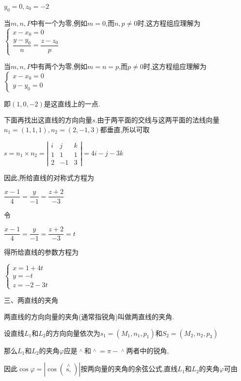 \documentclass[oneside]{book}
\begin{document}
${y_0} = 0,{z_0} =  - 2$

当$m,n,P$中有一个为零,例如$m=0$,而$n,p \ne 0$时,这方程组应理解为$\left\{\begin{array}{l}{x-x_{0}=0} \\ {\dfrac{y-y_{0}}{n}=\dfrac{z-z_{0}}{p}}\end{array}\right.$

当$m,n,P$中有两个为零,例如$m=n=p$,而$p \ne 0$时,这方程组应理解为$\left\{\begin{array}{l}{x-x_{0}=0} \\ {y-y_{0}=0}\end{array}\right.$

即$(1,0,-2)$是这直线上的一点.

下面再找出这直线的方向向量$s$.由于两平面的交线与这两平面的法线向量${n_1} = (1,1,1),{n_2} = (2, - 1,3)$都垂直,所以可取

$s=n_{1} \times n_{2}=\left|\begin{array}{ccc}{i} & {j} & {k} \\ {1} & {1} & {1} \\ {2} & {-1} & {3}\end{array}\right|=4 i-j-3 k$

因此,所给直线的对称式方程为

$\dfrac{{x - 1}}{4} = \dfrac{y}{{ - 1}} = \dfrac{{z + 2}}{{ - 3}}$

令

$\dfrac{{x - 1}}{4} = \dfrac{y}{{ - 1}} = \dfrac{{z + 2}}{{ - 3}} = t$

得所给直线的参数方程为

$\left\{\begin{array}{l}{x=1+4 t} \\ {y=-t} \\ {z=-2-3 t}\end{array}\right.$

三、两直线的夹角

两直线的方向向量的夹角(通常指锐角)叫做两直线的夹角.

设直线${L_1}$和${L_2}$的方向向量依次为${s_1} = ({M_1},{n_1},{p_1})$和${S_2} = ({M_2},{n_2},{p_3})$

那么${L_1}$和${L_2}$的夹角$\varphi $应是$\mathop {\left( {{s_1},{s_2}} \right)}\limits^ \wedge  $和$\mathop {\left( { - {s_1},{s_2}} \right)}\limits^ \wedge   = \pi  - \mathop {\left( { - {s_1},{s_2}} \right)}\limits^ \wedge  $两者中的锐角,

因此$\cos \varphi  = |\cos (\mathop {s{_1},{s_2}}\limits^ \wedge  )|$按两向量的夹角的余弦公式,直线${L_1}$和${L_2}$的夹角$\varphi $可由
\end{document}
